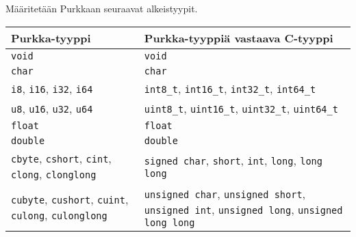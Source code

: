 \restoregeometry
{}


\renewcommand{\subsection}[1]{\vspace{1.7ex}{\large\textbf{#1}\vspace{1.7ex}}}

\subsection{Tyypit}

Määritetään Purkkaan seuraavat alkeistyypit. \\[0.3cm]
\begin{tabular}{@{}p{5.8cm}p{8.7cm}@{}} \toprule
    Purkka-tyyppi & Purkka-tyyppiä vastaava C-tyyppi \\ \midrule
    \texttt{void} & \texttt{void} \\
    \texttt{char} & \texttt{char} \\
    \texttt{i8}, \texttt{i16}, \texttt{i32}, \texttt{i64} &
    \texttt{int8\_t}, \texttt{int16\_t}, \texttt{int32\_t}, \texttt{int64\_t} \\
    \texttt{u8}, \texttt{u16}, \texttt{u32}, \texttt{u64} &
    \texttt{uint8\_t}, \texttt{uint16\_t}, \texttt{uint32\_t}, \texttt{uint64\_t} \\
    \texttt{float} & \texttt{float} \\
    \texttt{double} & \texttt{double} \\
    [0.3cm]

    \texttt{cbyte}, \texttt{cshort}, \texttt{cint}, \texttt{clong}, \texttt{clonglong}
    & \texttt{signed char}, \texttt{short}, \texttt{int}, \texttt{long}, \texttt{long long} \\
    \noalign{\vspace{0.3cm}}

    \texttt{cubyte}, \texttt{cushort}, \texttt{cuint}, \texttt{culong}, \texttt{culonglong}
    & \texttt{unsigned char}, \texttt{unsigned short}, \texttt{unsigned int},
      \texttt{unsigned long}, \texttt{unsigned long long} \\
    \bottomrule
\end{tabular} \\

